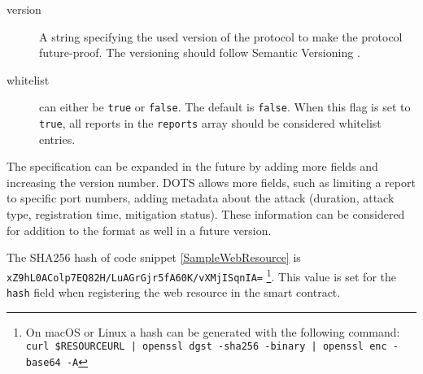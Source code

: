 \begin{description}

\item [version] A string specifying the used version of the protocol to make the protocol future-proof. The versioning should follow Semantic Versioning \cite{Semver}.

\item [whitelist] can either be \texttt{true} or \texttt{false}. The default is \texttt{false}. When this flag is set to \texttt{true}, all reports in the \texttt{reports} array should be considered whitelist entries.

\end{description}

The specification can be expanded in the future by adding more fields and increasing the version number. DOTS \cite{IETFDraft} allows more fields, such as limiting a report to specific port numbers, adding metadata about the attack (duration, attack type, registration time, mitigation status). These information can be considered for addition to the format as well in a future version.

The SHA256 hash of code snippet \ref{SampleWebResource} is \texttt{xZ9hL0AColp7EQ82H/LuAGrGjr5fA60K/vXMjISqnIA=} \footnote{On macOS or Linux a hash can be generated with the following command: \texttt{curl \$RESOURCEURL | openssl dgst -sha256 -binary | openssl enc -base64 -A}}. This value is set for the \texttt{hash} field when registering the web resource in the smart contract.
